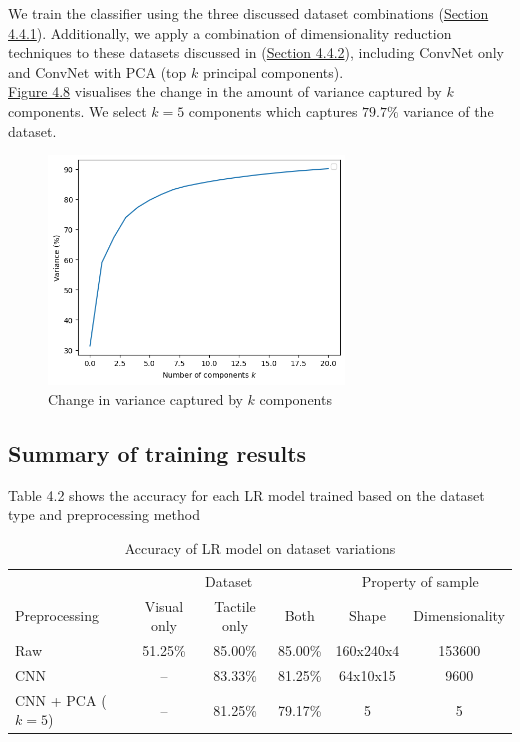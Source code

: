 \documentclass[11pt, a4paper]{report}
\begin{document}
We train the classifier using the three discussed dataset combinations (\hyperref[sec:4.4.1]{Section 4.4.1}). Additionally, we apply a combination of dimensionality reduction techniques to these datasets discussed in (\hyperref[sec:4.4.2]{Section 4.4.2}), including ConvNet only and ConvNet with PCA (top $k$ principal components).\\

\hyperref[fig:4.8]{Figure 4.8} visualises the change in the amount of variance captured by $k$ components. We select $k=5$ components which captures $79.7\%$ variance of the dataset.
\begin{figure}[H]
    \centering
    \includegraphics[width=0.7\textwidth]{docs/Project Report/Media/4_5_k_against_variance.png}
    \caption{Change in variance captured by $k$ components}
    \label{fig:4.8}
\end{figure}


\subsection{Summary of training results}
\label{sec:4.5.1}
Table 4.2 shows the accuracy for each LR model trained based on the dataset type and preprocessing method
\begin{table}[H]
    \centering
    \small
    \begin{tabular}{lccccc}
        \toprule
        & \multicolumn{3}{c}{Dataset} & \multicolumn{2}{c}{Property of sample} \\
        \cmidrule{2-4}\cmidrule{5-6}
        Preprocessing & Visual only & Tactile only & Both & Shape & Dimensionality \\
        \midrule
        Raw & 51.25\% & 85.00\% & 85.00\% & 160x240x4 & 153600 \\
        CNN & -- & 83.33\% & 81.25\% & 64x10x15  & 9600 \\
        CNN + PCA ($k=5$) & -- & 81.25\% & 79.17\% & 5 & 5\\
        \bottomrule
    \end{tabular}
    \caption{Accuracy of LR model on dataset variations}
    \label{tbl:4.2}
\end{table}
\end{document}
